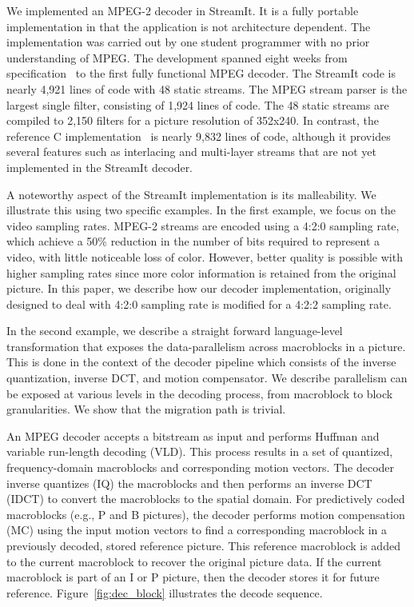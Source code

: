 
We implemented an MPEG-2 decoder in StreamIt. It is a fully portable
implementation in that the application is not architecture
dependent. The implementation was carried out by one student
programmer with no prior understanding of MPEG. The development
spanned eight weeks from specification~\cite{MPEG2} to the first fully
functional MPEG decoder. The StreamIt code is nearly 4,921 lines of
code with 48 static streams. The MPEG stream parser is the largest
single filter, consisting of 1,924 lines of code.  The 48 static
streams are compiled to 2,150 filters for a picture resolution of
352x240. In contrast, the reference C
implementation~\cite{reference-mpeg-c} is nearly 9,832 lines of code,
although it provides several features such as interlacing and
multi-layer streams that are not yet implemented in the StreamIt
decoder.

A noteworthy aspect of the StreamIt implementation is its
malleability. We illustrate this using two specific examples. 
In the first example, we focus on the video sampling rates. MPEG-2
streams are encoded using a 4:2:0 sampling rate, which achieve a 50\%
reduction in the number of bits required to represent a video, with
little noticeable loss of color. However, better quality is possible
with higher sampling rates since more color information is retained
from the original picture. In this paper, we describe how our
decoder implementation, originally designed to deal with 4:2:0
sampling rate is modified for a 4:2:2 sampling rate.

In the second example, we describe a straight forward language-level
transformation that exposes the data-parallelism across macroblocks in a
picture. This is done in the context of the decoder pipeline which
consists of the inverse quantization, inverse DCT, and motion
compensator. We describe parallelism can be exposed at various levels
in the decoding process, from macroblock to block granularities. We
show that the migration path is trivial.




An MPEG decoder accepts a bitstream as input and performs Huffman and
variable run-length decoding (VLD).  This process results in a set of
quantized, frequency-domain macroblocks and corresponding motion
vectors.  The decoder inverse quantizes (IQ) the macroblocks and then
performs an inverse DCT (IDCT) to convert the macroblocks to the
spatial domain.  For predictively coded macroblocks (e.g., P and B
pictures), the decoder performs motion compensation (MC) using the
input motion vectors to find a corresponding macroblock in a
previously decoded, stored reference picture. This reference
macroblock is added to the current macroblock to recover the original
picture data. If the current macroblock is part of an I or P picture,
then the decoder stores it for future reference.
Figure~\ref{fig:dec_block} illustrates the decode sequence.

